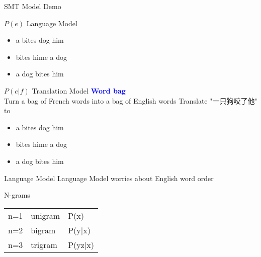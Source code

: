 \documentclass{beamer}
\begin{document}
\begin{frame}{SMT Model Demo}
    \begin{block}{$P(e)$ Language Model}
        \begin{itemize}
            \item a bites dog him
            \item bites hime a dog
            \item a dog bites him
        \end{itemize}
    \end{block}
    \pause
    \begin{block}{$P(e|f)$ Translation Model}
        \textcolor{blue}{\textbf{Word bag}} \\
        Turn a bag of French words into a bag of English words
        Translate "一只狗咬了他" to 
        \begin{itemize}
            \item a bites dog him
            \item bites hime a dog
            \item a dog bites him
        \end{itemize}
    \end{block}
\end{frame}

\begin{frame}{Language Model}
        Language Model worries about English word order
    \pause
    \begin{block}{N-grams}
        \begin{tabular}{ l  l  l}
            n=1 & unigram & P(x)\\
            n=2 & bigram  & P(y|x)\\
            n=3 & trigram & P(yz|x)
        \end{tabular}
    \end{block}

\end{frame}
\end{document}
